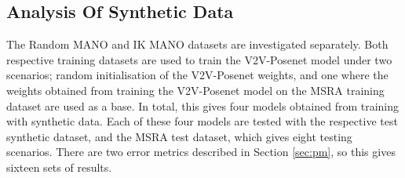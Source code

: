 \subsection{Analysis Of Synthetic Data}
The Random MANO and IK MANO datasets are investigated separately. Both respective training datasets are used to train the V2V-Posenet model under two scenarios; random initialisation of the V2V-Posenet weights, and one where the weights obtained from training the V2V-Posenet model on the MSRA training dataset are used as a base. In total, this gives four models obtained from training with synthetic data. Each of these four models are tested with the respective test synthetic dataset, and the MSRA test dataset, which gives eight testing scenarios. There are two error metrics described in Section \ref{sec:pm}, so this gives sixteen sets of results.



